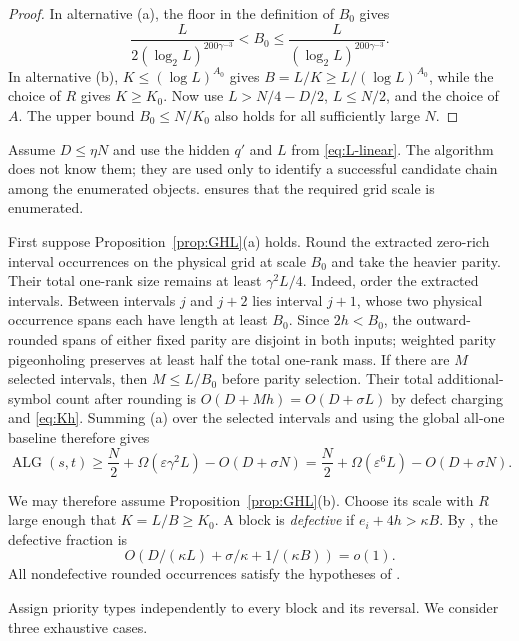 \documentclass[11pt]{article}
\theoremstyle{remark}
\newcommand{\eps}{\varepsilon}
\begin{document}
\begin{proof}
In alternative (a), the floor in the definition of $B_0$ gives
\[
 \frac{L}{2(\log_2L)^{200\gamma^{-3}}}
 <B_0\le \frac{L}{(\log_2L)^{200\gamma^{-3}}}.
\]
In alternative (b), $K\le(\log L)^{A_0}$ gives
$B=L/K\ge L/(\log L)^{A_0}$, while the choice of $R$ gives
$K\ge K_0$.  Now use $L>N/4-D/2$, $L\le N/2$, and the choice of $A$.
The upper bound $B_0\le N/K_0$ also holds for all sufficiently large $N$.
\end{proof}

Assume $D\le\eta N$ and use the hidden $q'$ and $L$ from
\eqref{eq:L-linear}.  The algorithm does not know them; they are used only to
identify a successful candidate chain among the enumerated objects.
 ensures that the required grid scale is enumerated.

First suppose Proposition~\ref{prop:GHL}(a) holds.  Round the extracted
zero-rich interval occurrences on the physical grid at scale $B_0$ and take
the heavier parity.  Their total one-rank size remains at least
$\gamma^2L/4$.  Indeed, order the extracted intervals.  Between intervals
$j$ and $j+2$ lies interval $j+1$, whose two physical occurrence spans each
have length at least $B_0$.  Since $2h<B_0$, the outward-rounded spans of
either fixed parity are disjoint in both inputs; weighted parity
pigeonholing preserves at least half the total one-rank mass.  If there are
$M$ selected intervals, then
$M\le L/B_0$ before parity selection.  Their total additional-symbol count
after rounding is $O(D+Mh)=O(D+\sigma L)$ by defect charging and
\eqref{eq:Kh}.  Summing (a) over the selected intervals
and using the global all-one baseline therefore gives
\begin{equation}\label{eq:huge-gain}
 \operatorname{ALG}(s,t)
 \ge\frac N2+\Omega(\eps\gamma^2L)-O(D+\sigma N)
 =\frac N2+\Omega(\eps^6L)-O(D+\sigma N).
\end{equation}

We may therefore assume Proposition~\ref{prop:GHL}(b).  Choose its scale with
$R$ large enough that $K=L/B\ge K_0$.  A block is \emph{defective} if
$e_i+4h>\kappa B$.  By , the defective fraction is
\[
 O(D/(\kappa L)+\sigma/\kappa+1/(\kappa B))=o(1).
\]
All nondefective rounded occurrences satisfy the hypotheses of
.

Assign priority types independently to every block and its reversal.  We
consider three exhaustive cases.
\end{document}
